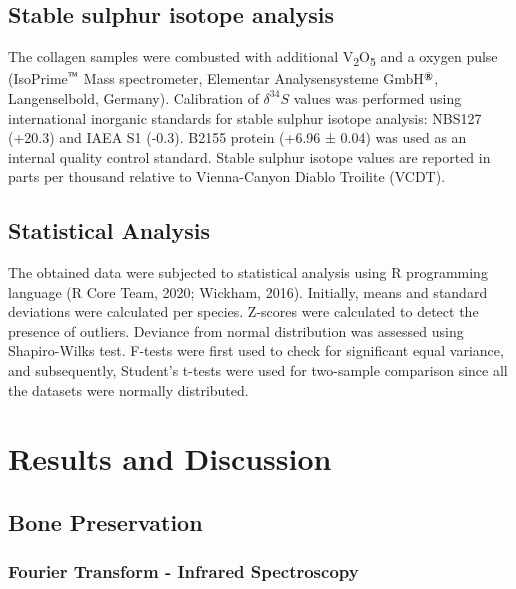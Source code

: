 \documentclass[5p]{elsarticle} %
\begin{document}
\hypertarget{stable-sulphur-isotope-analysis}{%
\subsection{Stable sulphur isotope analysis}\label{stable-sulphur-isotope-analysis}}

The collagen samples were combusted with additional V\textsubscript{2}O\textsubscript{5} and a oxygen pulse (IsoPrime\(^\text{\texttrademark}\) Mass spectrometer, Elementar Analysensysteme GmbH\(^\text{\textregistered}\), Langenselbold, Germany). Calibration of \(\delta ^{34}S\) values was performed using international inorganic standards for stable sulphur isotope analysis: NBS127 (+20.3\permil) and IAEA S1 (-0.3\permil). B2155 protein (+6.96 ± 0.04\permil) was used as an internal quality control standard. Stable sulphur isotope values are reported in parts per thousand relative to Vienna-Canyon Diablo Troilite (VCDT).

\hypertarget{statistical-analysis}{%
\subsection{Statistical Analysis}\label{statistical-analysis}}

The obtained data were subjected to statistical analysis using R programming language (R Core Team, 2020; Wickham, 2016). Initially, means and standard deviations were calculated per species. Z-scores were calculated to detect the presence of outliers. Deviance from normal distribution was assessed using Shapiro-Wilks test. F-tests were first used to check for significant equal variance, and subsequently, Student's t-tests were used for two-sample comparison since all the datasets were normally distributed.

\hypertarget{results-and-discussion}{%
\section{Results and Discussion}\label{results-and-discussion}}

\hypertarget{bone-preservation}{%
\subsection{Bone Preservation}\label{bone-preservation}}

\hypertarget{fourier-transform---infrared-spectroscopy}{%
\subsubsection{Fourier Transform - Infrared Spectroscopy}\label{fourier-transform---infrared-spectroscopy}}
\end{document}
